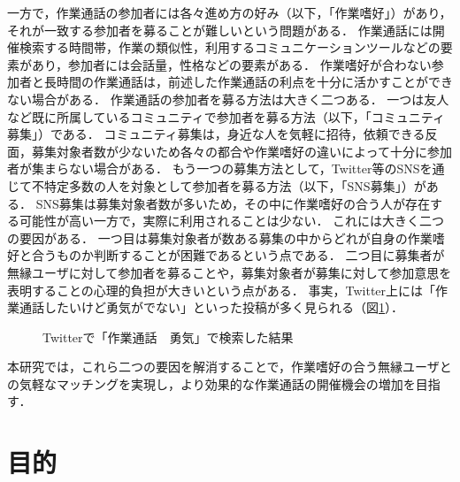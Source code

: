 一方で，作業通話の参加者には各々進め方の好み（以下，「作業嗜好」）があり，それが一致する参加者を募ることが難しいという問題がある．
作業通話には開催検索する時間帯，作業の類似性，利用するコミュニケーションツールなどの要素があり，参加者には会話量，性格などの要素がある．
作業嗜好が合わない参加者と長時間の作業通話は，前述した作業通話の利点を十分に活かすことができない場合がある．
作業通話の参加者を募る方法は大きく二つある．
一つは友人など既に所属しているコミュニティで参加者を募る方法（以下，「コミュニティ募集」）である．
コミュニティ募集は，身近な人を気軽に招待，依頼できる反面，募集対象者数が少ないため各々の都合や作業嗜好の違いによって十分に参加者が集まらない場合がある．
もう一つの募集方法として，Twitter\cite{Twitter}等のSNSを通じて不特定多数の人を対象として参加者を募る方法（以下，「SNS募集」）がある．
SNS募集は募集対象者数が多いため，その中に作業嗜好の合う人が存在する可能性が高い一方で，実際に利用されることは少ない．
これには大きく二つの要因がある．
一つ目は募集対象者が数ある募集の中からどれが自身の作業嗜好と合うものか判断することが困難であるという点である．
二つ目に募集者が無縁ユーザに対して参加者を募ることや，募集対象者が募集に対して参加意思を表明することの心理的負担が大きいという点がある．
事実，Twitter上には「作業通話したいけど勇気がでない」といった投稿が多く見られる（図\ref{fig:search_results}）．

\begin{figure}
    \centering
    \caption{Twitterで「作業通話　勇気」で検索した結果}
    \label{fig:search_results}
\end{figure}

本研究では，これら二つの要因を解消することで，作業嗜好の合う無縁ユーザとの気軽なマッチングを実現し，より効果的な作業通話の開催機会の増加を目指す．

\section{目的}

